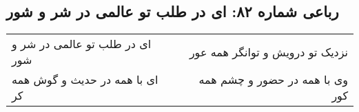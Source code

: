 \begin{center}
\section*{رباعی شماره ۸۲: ای در طلب تو عالمی در شر و شور}
\label{sec:082}
\begin{longtable}{l p{0.5cm} r}
ای در طلب تو عالمی در شر و شور
&&
نزدیک تو درویش و توانگر همه عور
\\
ای با همه در حدیث و گوش همه کر
&&
وی با همه در حضور و چشم همه کور
\\
\end{longtable}
\end{center}
